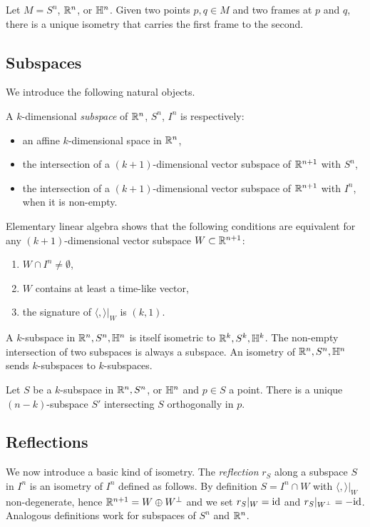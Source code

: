 \begin{cor} \label{riferimento:cor}
Let $M= S^n$, $\mathbb{R}^n$, or $\mathbb{H}^n$. Given two points $p,q \in M$ and two frames at $p$ and $q$, there is a unique isometry that carries the first frame to the second.
\end{cor}

\subsection{Subspaces}
We introduce the following natural objects. 

\begin{defn}
A $k$-dimensional \emph{subspace} of $\mathbb{R}^n$, $S^n$, $I^n$ is respectively:
\begin{itemize}
\item an affine $k$-dimensional space in $\mathbb{R}^n$,
\item the intersection of a $(k+1)$-dimensional vector subspace of $\mathbb{R}^{n+1}$ with $S^n$,
\item the intersection of a $(k+1)$-dimensional vector subspace of $\mathbb{R}^{n+1}$ with $I^n$, when it is non-empty.
\end{itemize}
\end{defn}
\begin{oss}
Elementary linear algebra shows that the following conditions are equivalent for any $(k+1)$-dimensional vector subspace $W\subset\mathbb{R}^{n+1}$:
\begin{enumerate}
\item $W\cap I^n \neq \emptyset$,
\item $W$ contains at least a time-like vector,
\item the signature of $\langle,\rangle|_W$ is $(k,1)$.
\end{enumerate}
\end{oss}

A $k$-subspace in $\mathbb{R}^n, S^n, \mathbb{H}^n$ is itself isometric to $\mathbb{R}^k, S^k, \mathbb{H}^k$. 
The non-empty intersection of two subspaces is always a subspace. An isometry of $\mathbb{R}^n, S^n, \mathbb{H}^n$ sends $k$-subspaces to $k$-subspaces. 

\begin{ex}
Let $S$ be a $k$-subspace in $\mathbb{R}^n, S^n$, or $\mathbb{H}^n$ and $p\in S$ a point. There is a unique $(n-k)$-subspace $S'$ intersecting $S$ orthogonally in $p$.
\end{ex}

\subsection{Reflections} \label{reflections:subsection}
We now introduce a basic kind of isometry.
The \emph{reflection} $r_S$ along a subspace $S$ in $I^n$ is an isometry of $I^n$ defined as follows. By definition $S=I^n \cap W$ with $\langle,\rangle|_W$ non-degenerate, hence $\mathbb{R}^{n+1} = W \oplus W^\bot$ and we set $r_S|_W = {\rm id}$ and $r_S|_{W^\bot} = -{\rm id}$.
Analogous definitions work for subspaces of $S^n$ and $\mathbb{R}^n$. 

